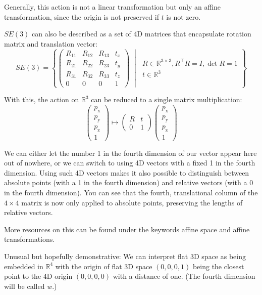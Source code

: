 \documentclass[twocolumn,10pt]{article}
\begin{document}
Generally, this action is not a linear transformation but only an affine transformation, since the origin is not preserved if $t$ is not zero.

$SE(3)$ can also be described as a set of 4D matrices that encapsulate rotation matrix and translation vector:
\[
    SE(3) = \left\{ \begin{pmatrix}R_{11}&R_{12}&R_{13}&t_{x}\\R_{21}&R_{22}&R_{23}&t_{y}\\R_{31}&R_{32}&R_{33}&t_{z}\\0&0&0&1\end{pmatrix} \;\middle|\; \begin{gathered} R \in \mathbb{R}^{3 \times 3}, R^\top R = I, \det R = 1 \\ t \in \mathbb{R}^3 \end{gathered} \right\}
\]

With this, the action on $\mathbb{R}^3$ can be reduced to a single matrix multiplication:
\[
    \begin{pmatrix}p_\mathrm{x}\\p_\mathrm{y}\\p_\mathrm{z}\\1\end{pmatrix} \mapsto \begin{pmatrix}R & t \\ 0 & 1\end{pmatrix} \begin{pmatrix}p_\mathrm{x}\\p_\mathrm{y}\\p_\mathrm{z}\\1\end{pmatrix}
\]

We can either let the number 1 in the fourth dimension of our vector appear here out of nowhere, or we can switch to using 4D vectors with a fixed 1 in the fourth dimension. Using such 4D vectors makes it also possible to distinguish between absolute points (with a 1 in the fourth dimension) and relative vectors (with a 0 in the fourth dimension). You can see that the fourth, translational column of the $4 \times 4$ matrix is now only applied to absolute points, preserving the lengths of relative vectors.

More resources on this can be found under the keywords affine space and affine transformations.

Unusual but hopefully demonstrative: We can interpret flat 3D space as being embedded in $\mathbb{R}^4$ with the origin of flat 3D space $(0, 0, 0, 1)$ being the closest point to the 4D origin $(0, 0, 0, 0)$ with a distance of one. (The fourth dimension will be called $w$.)
\end{document}

